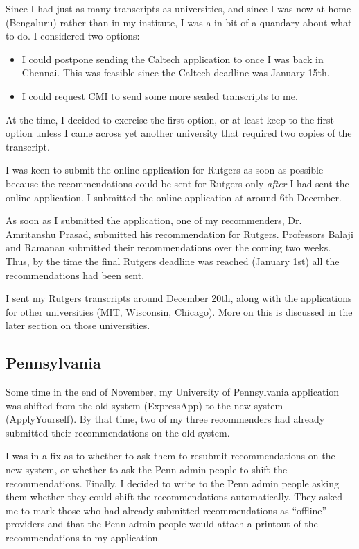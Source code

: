 \documentclass[a4paper]{amsart}
\begin{document}
Since I had just as many transcripts as universities, and since I was now at
home (Bengaluru) rather than in my institute, I was a in bit of a quandary
about what to do. I considered two options:

\begin{itemize}

\item I could postpone sending the Caltech application to once I was
  back in Chennai. This was feasible since the Caltech
  deadline was January 15th.

\item I could request CMI to send some more sealed transcripts to me.

\end{itemize}

At the time, I decided to exercise the first option, or at least keep to
the first option unless I came across yet another university that required
two copies of the transcript.

I was keen to submit the online application for Rutgers as soon as
possible because the recommendations could be sent for Rutgers only
{\em after} I had sent the online application. I submitted the online
application at around 6th December.

As soon as I submitted the application, one of my recommenders,
Dr. Amritanshu Prasad, submitted his recommendation for
Rutgers. Professors Balaji and Ramanan submitted their recommendations
over the coming two weeks. Thus, by the time the final Rutgers deadline
was reached (January 1st) all the recommendations had been sent.

I sent my Rutgers transcripts around December 20th, along with the applications
for other universities (MIT, Wisconsin, Chicago). More on this is discussed
in the later section on those universities.

\subsection{Pennsylvania}

Some time in the end of November, my University of Pennsylvania
application was shifted from the old system (ExpressApp) to the new
system (ApplyYourself). By that time, two of my three recommenders had
already submitted their recommendations on the old system.

I was in a fix as to whether to ask them to resubmit recommendations
on the new system, or whether to ask the Penn admin people to shift
the recommendations. Finally, I decided to write to the Penn admin people
asking them whether they could shift the recommendations automatically.
They asked me to mark those who had already submitted recommendations
as ``offline'' providers and that the Penn admin people would attach a printout
of the recommendations to my application.
\end{document}
